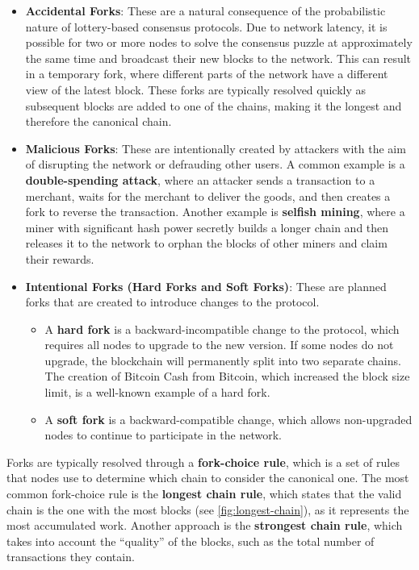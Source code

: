 \begin{itemize}
	\item
	\textbf{Accidental Forks}: These are a natural consequence of the
	probabilistic nature of lottery-based consensus protocols. Due to
	network latency, it is possible for two or more nodes to solve the
	consensus puzzle at approximately the same time and broadcast their
	new blocks to the network. This can result in a temporary fork, where
	different parts of the network have a different view of the latest
	block. These forks are typically resolved quickly as subsequent blocks
	are added to one of the chains, making it the longest and therefore
	the canonical chain.
	\item
	\textbf{Malicious Forks}: These are intentionally created by attackers
	with the aim of disrupting the network or defrauding other users. A
	common example is a \textbf{double-spending attack}, where an attacker
	sends a transaction to a merchant, waits for the merchant to deliver
	the goods, and then creates a fork to reverse the transaction. Another
	example is \textbf{selfish mining}, where a miner with significant
	hash power secretly builds a longer chain and then releases it to the
	network to orphan the blocks of other miners and claim their rewards.
	\item
	\textbf{Intentional Forks (Hard Forks and Soft Forks)}: These are
	planned forks that are created to introduce changes to the protocol.
	
	\begin{itemize}
		\tightlist
		\item
		A \textbf{hard fork} is a backward-incompatible change to the
		protocol, which requires all nodes to upgrade to the new version. If
		some nodes do not upgrade, the blockchain will permanently split
		into two separate chains. The creation of Bitcoin Cash from Bitcoin,
		which increased the block size limit, is a well-known example of a
		hard fork.
		\item
		A \textbf{soft fork} is a backward-compatible change, which allows
		non-upgraded nodes to continue to participate in the network.
	\end{itemize}
\end{itemize}

Forks are typically resolved through a \textbf{fork-choice rule}, which
is a set of rules that nodes use to determine which chain to consider
the canonical one. The most common fork-choice rule is the
\textbf{longest chain rule}, which states that the valid chain is the
one with the most blocks (see \autoref{fig:longest-chain}), as it represents the most accumulated work.
Another approach is the \textbf{strongest chain rule}, which takes into
account the ``quality'' of the blocks, such as the total number of
transactions they contain.

